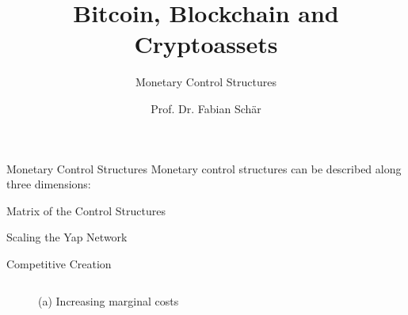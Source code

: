 \documentclass[]{beamer}
\title{Bitcoin, Blockchain and Cryptoassets}
\subtitle{Monetary Control Structures}
\author{Prof. Dr. Fabian Schär}
\institute{University of Basel}
\begin{document}
\thispagestyle{empty}
\begin{frame}[noframenumbering]
	\titlepage
\end{frame}

\begin{frame}{Monetary Control Structures}
	Monetary control structures can be described along three dimensions:
	\vspace{1.5em}
	\begin{figure}
		
	\end{figure}
\end{frame}

\begin{frame}{Matrix of the Control Structures}
	\begin{figure}
		
	\end{figure}
\end{frame}

\begin{frame}{Scaling the Yap Network}
	\begin{figure}
			
	\end{figure}
	\vspace{1.5em}
\end{frame}

\begin{frame}{Competitive Creation}
	\begin{columns}
		\begin{column}{0.5\textwidth}
			\begin{figure}
				
				\caption*{(a) Increasing marginal costs}
			\end{figure}
		\end{column}
		\begin{column}{0.5\textwidth}
			\begin{figure}
			\end{figure}
		\end{column}
	\end{columns}
\end{frame}
\end{document}
